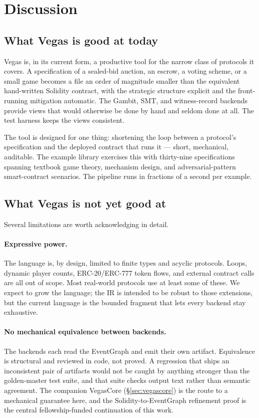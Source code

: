 \section{Discussion}
\label{sec:discussion}

\subsection{What Vegas is good at today}

Vegas is, in its current form, a productive tool for the narrow
class of protocols it covers.  A specification of a sealed-bid
auction, an escrow, a voting scheme, or a small game becomes a
file an order of magnitude smaller than the equivalent
hand-written Solidity contract, with the strategic structure
explicit and the front-running mitigation automatic.  The
Gambit, SMT, and witness-record backends provide views that
would otherwise be done by hand and seldom done at all.  The
test harness keeps the views consistent.

The tool is designed for one thing: shortening the loop between
a protocol's specification and the deployed contract that runs
it --- short, mechanical, auditable.  The example library exercises this with thirty-nine
specifications spanning textbook game theory, mechanism design,
and adversarial-pattern smart-contract scenarios.  The pipeline
runs in fractions of a second per example.

\subsection{What Vegas is not yet good at}

Several limitations are worth acknowledging in detail.

\paragraph{Expressive power.}  The language is, by design,
limited to finite types and acyclic protocols.  Loops, dynamic
player counts, ERC-20/ERC-777 token flows, and external contract
calls are all out of scope.  Most real-world protocols use at
least some of these.  We expect to grow the language; the IR is
intended to be robust to those extensions, but the current
language is the bounded fragment that lets every backend stay
exhaustive.

\paragraph{No mechanical equivalence between backends.}  The
backends each read the EventGraph and emit their own artifact.
Equivalence is structural and reviewed in code, not proved.
A regression that ships an inconsistent pair of artifacts would
not be caught by anything stronger than the golden-master test
suite, and that suite checks output text rather than semantic
agreement.  The companion VegasCore (\S\ref{sec:vegascore}) is
the route to a mechanical guarantee here, and the
Solidity-to-EventGraph refinement proof is the central
fellowship-funded continuation of this work.


